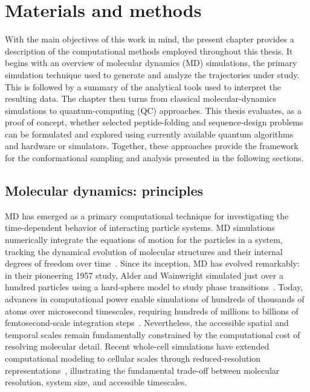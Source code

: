 \chapter{Materials and methods}\label{methods}

\newpage

With the main objectives of this work in mind, the present chapter provides a description of the computational methods employed throughout this thesis. It begins with an overview of molecular dynamics (MD) simulations, the primary simulation technique used to generate and analyze the trajectories under study. This is followed by a summary of the analytical tools used to interpret the resulting data. The chapter then turns from classical molecular-dynamics simulations to quantum-computing (QC) approaches. This thesis evaluates, as a proof of concept, whether selected peptide-folding and sequence-design problems can be formulated and explored using currently available quantum algorithms and hardware or simulators. Together, these approaches provide the framework for the conformational sampling and analysis presented in the following sections.


\section{Molecular dynamics: principles}

MD has emerged as a primary computational technique for investigating the time-dependent behavior of interacting particle systems. MD simulations numerically integrate the equations of motion for the particles in a system, tracking the dynamical evolution of molecular structures and their internal degrees of freedom over time~\cite{braun2018best}. Since its inception, MD has evolved remarkably: in their pioneering 1957 study, Alder and Wainwright simulated just over a hundred particles using a hard-sphere model to study phase transitions~\cite{alder1957phase}. Today, advances in computational power enable simulations of hundreds of thousands of atoms over microsecond timescales, requiring hundreds of millions to billions of femtosecond-scale integration steps~\cite{Acun2018,charron2025navigating}. Nevertheless, the accessible spatial and temporal scales remain fundamentally constrained by the computational cost of resolving molecular detail. Recent whole-cell simulations have extended computational modeling to cellular scales through reduced-resolution representations~\cite{THORNBURG2026}, illustrating the fundamental trade-off between molecular resolution, system size, and accessible timescales.

